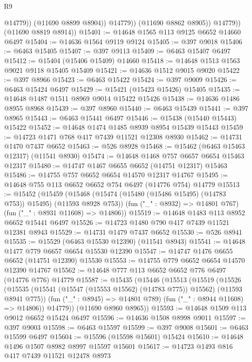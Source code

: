 \begin{lexlean}{R9}
\begin{coremodule}
                      @14779))
                  (@11690 @8899 @8904))
                @14779))
            (@11690 @8862 @8905))
          @14779))
      (@11690 @8819 @8914))
@15401 := @14648 @1565 @113 @9125 @6652 @14660 @6497
@15404 := @14636 @1564 @9119 @9124
@15405 := @397 @9018
@15406 := @6463 @15405
@15407 := @397 @9113
@15409 := @6463 @15407 @6497
@15412 := @15404 (@15406 @15409) @14660
@15418 := @14648 @1513 @1563 @9021 @9118 @15405 @15409
@15421 := @14636 @1512 @9015 @9020
@15422 := @397 @8966
@15423 := @6463 @15422
@15424 := @397 @9009
@15426 := @6463 @15424 @6497
@15429 := @15421 (@15423 @15426) @15405
@15435 := @14648 @1487 @1511 @8969 @9014 @15422 @15426
@15438 := @14636 @1486 @8955 @8968
@15439 := @397 @8960
@15440 := @6463 @15439
@15441 := @397 @8965
@15443 := @6463 @15441 @6497
@15446 := @15438 (@15440 @15443) @15422
@15452 := @14648 @1474 @1485 @8939 @8954 @15439 @15443
@15459 := @14723 @1471 @768 @417 @7439 @11521 @12308 @8930
@15462 := @14731 @1470 @7437 @6652
@15463 := @526 @8928
@15468 := @15462 (@6463 @15463 @12317) (@11541 @8930)
@15474 := @14648 @1468 @757 @6657 @6654 @15463 @12317
@15480 := @14747 @1467 @6655 @6652 (@14751 @12317) @15463
@15486 := @14755 @757 @6652 @6654 @14570 @12317 @14767
@15495 := @14648 @755 @113 @6652 @6652 @754 @6497 (@14776 @754) @14779
@15513 := @15452
    (@15459
      (@15468 (@15474 (@15480 (@15486 @15495) (@14783 @753)) @15495) (@11593 @8928 @753))
      (fun ("_" : @8932) => @14801 @767)
      (fun ("_" : @8931 @11608) => @14806))
@15519 := @14648 @1483 @113 @8952 @6652 @15441 @6497
@15526 := @14723 @1480 @790 @417 @7439 @11521 @12381 @8943
@15529 := @14731 @1479 @7437 @6652
@15530 := @526 @8941
@15535 := @15529 (@6463 @15530 @12390) (@11541 @8943)
@15541 := @14648 @1477 @779 @6657 @6654 @15530 @12390
@15547 := @14747 @1476 @6655 @6652 (@14751 @12390) @15530
@15553 := @14755 @779 @6652 @6654 @14570 @12390 @14767
@15562 := @14648 @777 @113 @6652 @6652 @776 @6497 (@14776 @776) @14779
@15587 := @15435
    (@15446
      (@15513
        (@15519
          (@15526
            (@15535 (@15541 (@15547 (@15553 @15562) (@14783 @775)) @15562) (@11593 @8941 @775))
            (fun ("_" : @8945) => @14801 @789)
            (fun ("_" : @8944 @11608) => @14806))
          @14779))
      (@11690 @8960 @8965))
@15593 := @14648 @1509 @113 @9012 @6652 @15424 @6497
@15596 := @14636 @1508 @8998 @9011
@15597 := @397 @9003
@15598 := @6463 @15597
@15599 := @397 @9008
@15601 := @6463 @15599 @6497
@15604 := @15596 (@15598 @15601) @15424
@15610 := @14648 @1496 @1507 @8982 @8997 @15597 @15601
@15617 := @14723 @1493 @816 @417 @7439 @11521 @12478 @8973

\end{coremodule}
\end{lexlean}
